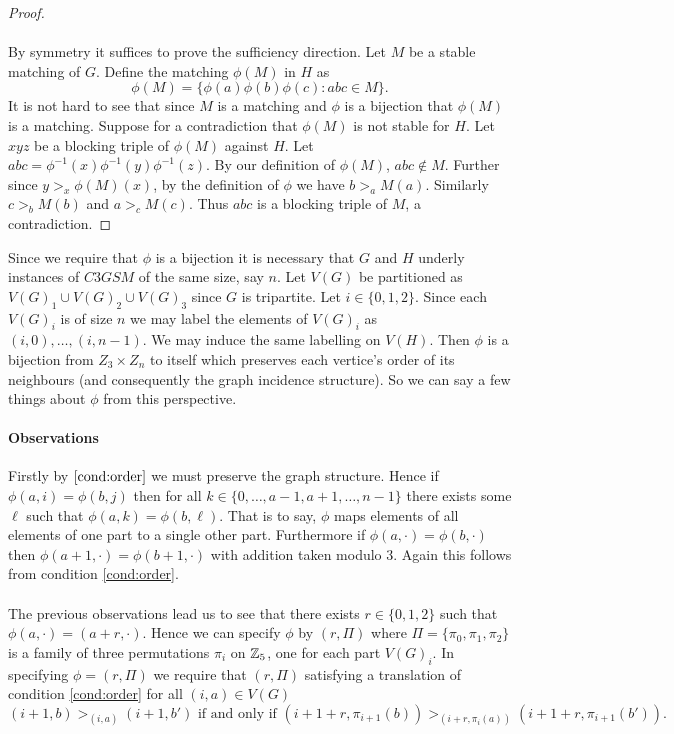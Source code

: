 \begin{definition}
\begin{proof}
 \paragraph{}
 By symmetry it suffices to prove the sufficiency direction. Let $M$ be a stable matching of $G$. Define the matching $\phi(M)$ in $H$ as
 $$\phi(M) = \{ \phi(a)\phi(b)\phi(c): abc \in M \}.$$
 It is not hard to see that since $M$ is a matching and $\phi$ is a bijection that $\phi(M)$ is a matching. Suppose for a contradiction that $\phi(M)$ is not stable for $H$. Let $xyz$ be a blocking triple of $\phi(M)$ against $H$. Let $abc = \phi^{-1}(x)\phi^{-1}(y)\phi^{-1}(z)$. By our definition of $\phi(M)$, $abc \not\in M$. Further since $y >_x \phi(M)(x)$, by the definition of $\phi$ we have $b >_a M(a)$. Similarly $c>_b M(b)$ and $a>_c M(c)$. Thus $abc$ is a blocking triple of $M$, a contradiction.
 \end{proof}
 \begin{note}\label{note:labels}
 Since we require that $\phi$ is a bijection it is necessary that $G$ and $H$ underly instances of $C3GSM$ of the same size, say $n$. Let $V(G)$ be partitioned as $V(G)_1 \cup V(G)_2 \cup V(G)_3$ since $G$ is tripartite. Let $i \in \{0,1,2\}$. Since each $V(G)_i$ is of size $n$ we may label the elements of $V(G)_i$ as $(i,0), \dots, (i,n-1)$. We may induce the same labelling on $V(H)$. Then $\phi$ is a bijection from $Z_3 \times Z_n$ to itself which preserves each vertice's order of its neighbours (and consequently the graph incidence structure). So we can say a few things about $\phi$ from this perspective.
 \end{note}
 \paragraph{Observations} Firstly by $\ref{cond:order}$ we must preserve the graph structure. Hence if $\phi(a,i) = \phi(b, j)$ then for all $k \in \{0,\dots,a-1,a+1,\dots,n-1\}$ there exists some $\ell$ such that $\phi(a,k) = \phi(b,\ell)$. That is to say, $\phi$ maps elements of all elements of one part to a single other part. Furthermore if $\phi(a,\cdot) = \phi(b,\cdot)$ then $\phi(a+1,\cdot) = \phi(b+1, \cdot)$ with addition taken modulo $3$. Again this follows from condition \ref{cond:order}.
\paragraph{}
The previous observations lead us to see that there exists $r \in \{0,1,2\}$ such that $\phi(a, \cdot) = (a+r,\cdot)$. Hence we can specify $\phi$ by $(r,\Pi)$ where $\Pi = \{\pi_0, \pi_1,\pi_2\}$ is a family of three permutations $\pi_i$ on $\mathbb{Z}_5$, one for each part $V(G)_i$. In specifying $\phi=(r,\Pi)$ we require that $(r,\Pi)$ satisfying a translation of condition \ref{cond:order} for all $(i,a) \in V(G)$
\begin{equation}\label{cond:orderT}
(i+1,b) >_{(i,a)} (i+1, b') \text{ if and only if } (i+1+r, \pi_{i+1}(b)) >_{(i+r,\pi_i(a))} (i+1+r, \pi_{i+1}(b')).
\end{equation}

\end{definition}
